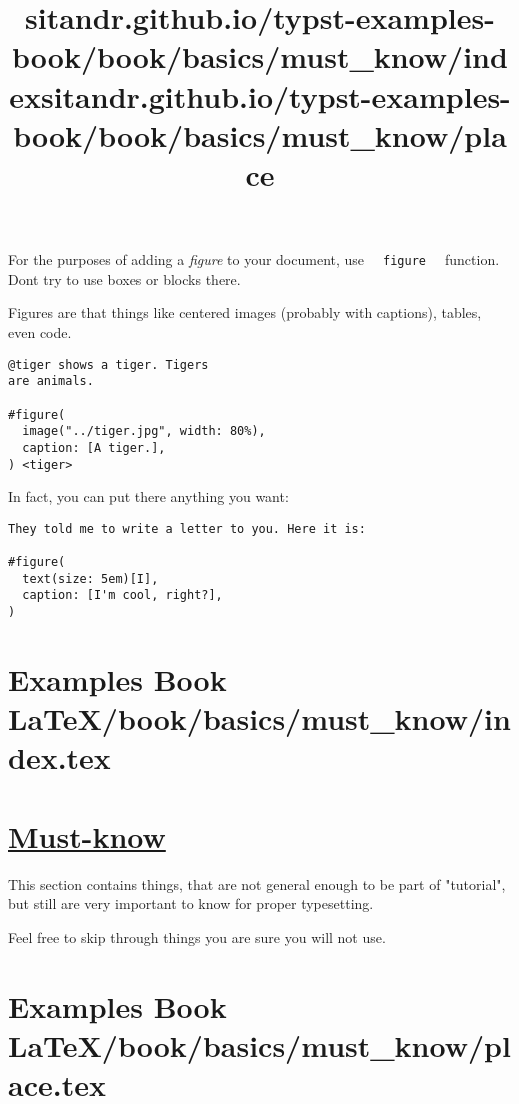 For the purposes of adding a \emph{figure} to your document, use
\texttt{\ }{\texttt{\ figure\ }}\texttt{\ } function.
Don\textquotesingle t try to use boxes or blocks there.

Figures are that things like centered images (probably with captions),
tables, even code.

\begin{verbatim}
@tiger shows a tiger. Tigers
are animals.

#figure(
  image("../tiger.jpg", width: 80%),
  caption: [A tiger.],
) <tiger>
\end{verbatim}

\pandocbounded{}

In fact, you can put there anything you want:

\begin{verbatim}
They told me to write a letter to you. Here it is:

#figure(
  text(size: 5em)[I],
  caption: [I'm cool, right?],
)
\end{verbatim}

\pandocbounded{}


\section{Examples Book LaTeX/book/basics/must_know/index.tex}
\title{sitandr.github.io/typst-examples-book/book/basics/must_know/index}

\section{\texorpdfstring{\hyperref[must-know]{Must-know}}{Must-know}}\label{must-know}

This section contains things, that are not general enough to be part of
"tutorial", but still are very important to know for proper typesetting.

Feel free to skip through things you are sure you will not use.


\section{Examples Book LaTeX/book/basics/must_know/place.tex}
\title{sitandr.github.io/typst-examples-book/book/basics/must_know/place}

